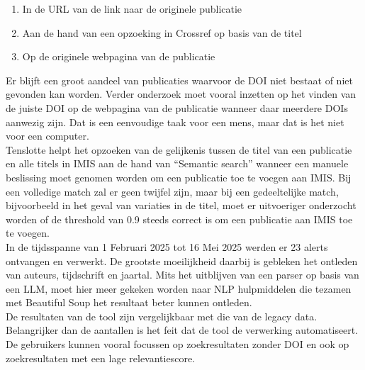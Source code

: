 \begin{enumerate}
    \item In de URL van de link naar de originele publicatie
    \item Aan de hand van een opzoeking in Crossref op basis van de titel
    \item Op de originele webpagina van de publicatie
\end{enumerate}
Er blijft een groot aandeel van publicaties waarvoor de DOI niet bestaat of niet gevonden kan worden. Verder onderzoek moet vooral inzetten op het vinden van de juiste DOI op de webpagina van de publicatie wanneer daar meerdere DOIs aanwezig zijn. Dat is een eenvoudige taak voor een mens, maar dat is het niet voor een computer.\\
Tenslotte helpt het opzoeken van de gelijkenis tussen de titel van een publicatie en alle titels in IMIS aan de hand van ``Semantic search'' wanneer een manuele beslissing moet genomen worden om een publicatie toe te voegen aan IMIS. Bij een volledige match zal er geen twijfel zijn, maar bij een gedeeltelijke match, bijvoorbeeld in het geval van variaties in de titel, moet er uitvoeriger onderzocht worden of de threshold van 0.9 steeds correct is om een publicatie aan IMIS toe te voegen.\\
In de tijdsspanne van 1 Februari 2025 tot 16 Mei 2025 werden er 23 alerts ontvangen en verwerkt. De grootste moeilijkheid daarbij is gebleken het ontleden van auteurs, tijdschrift en jaartal. Mits het uitblijven van een parser op basis van een LLM, moet hier meer gekeken worden naar NLP hulpmiddelen die tezamen met Beautiful Soup het resultaat beter kunnen ontleden.\\
De resultaten van de tool zijn vergelijkbaar met die van de legacy data. Belangrijker dan de aantallen is het feit dat de tool de verwerking automatiseert. De gebruikers kunnen vooral focussen op zoekresultaten zonder DOI en ook op zoekresultaten met een lage relevantiescore.

